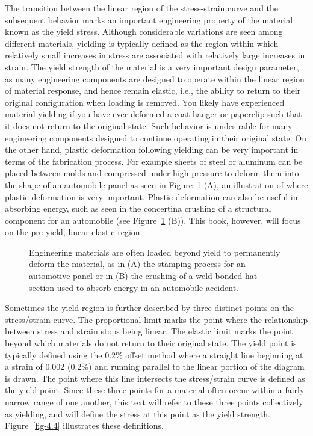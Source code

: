\documentclass[
  letterpaper,
  DIV=11,
  numbers=noendperiod]{scrreprt}
\theoremstyle{definition}
\theoremstyle{remark}
\begin{document}
The transition between the linear region of the stress-strain curve and
the subsequent behavior marks an important engineering property of the
material known as the yield stress. Although considerable variations are
seen among different materials, yielding is typically defined as the
region within which relatively small increases in stress are associated
with relatively large increases in strain. The yield strength of the
material is a very important design parameter, as many engineering
components are designed to operate within the linear region of material
response, and hence remain elastic, i.e., the ability to return to their
original configuration when loading is removed. You likely have
experienced material yielding if you have ever deformed a coat hanger or
paperclip such that it does not return to the original state. Such
behavior is undesirable for many engineering components designed to
continue operating in their original state. On the other hand, plastic
deformation following yielding can be very important in terms of the
fabrication process. For example sheets of steel or aluminum can be
placed between molds and compressed under high pressure to deform them
into the shape of an automobile panel as seen in Figure~\ref{fig-4.3}
(A), an illustration of where plastic deformation is very important.
Plastic deformation can also be useful in absorbing energy, such as seen
in the concertina crushing of a structural component for an automobile
(see Figure~\ref{fig-4.3} (B)). This book, however, will focus on the
pre-yield, linear elastic region.

\begin{figure}


\caption{\label{fig-4.3}Engineering materials are often loaded beyond
yield to permanently deform the material, as in (A) the stamping process
for an automotive panel or in (B) the crushing of a weld-bonded hat
section used to absorb energy in an automobile accident.}

\end{figure}%

Sometimes the yield region is further described by three distinct points
on the stress/strain curve. The proportional limit marks the point where
the relationship between stress and strain stops being linear. The
elastic limit marks the point beyond which materials do not return to
their original state. The yield point is typically defined using the
0.2\% offset method where a straight line beginning at a strain of 0.002
(0.2\%) and running parallel to the linear portion of the diagram is
drawn. The point where this line intersects the stress/strain curve is
defined as the yield point. Since these three points for a material
often occur within a fairly narrow range of one another, this text will
refer to these three points collectively as yielding, and will define
the stress at this point as the yield strength. Figure~\ref{fig-4.4}
illustrates these definitions.
\end{document}
